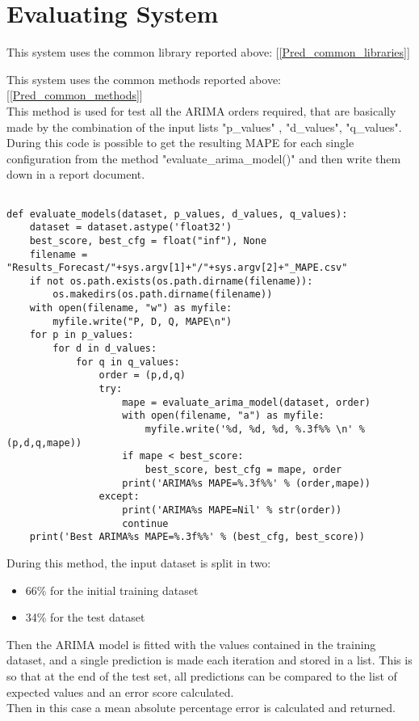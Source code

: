 \newpage

\section{Evaluating System}
\label{Evaluating_System}
This system uses the common library reported above: [\ref{Pred_common_libraries}]

This system uses the common methods reported above: [\ref{Pred_common_methods}] \\


This method is used for test all the ARIMA orders required, that are basically made by the combination of the input lists "p\_values" , "d\_values", "q\_values". During this code is possible to get the resulting MAPE for each single configuration from the method "evaluate\_arima\_model()" and then write them down in a report document.
\begin{lstlisting}

def evaluate_models(dataset, p_values, d_values, q_values):
	dataset = dataset.astype('float32')
	best_score, best_cfg = float("inf"), None
	filename = "Results_Forecast/"+sys.argv[1]+"/"+sys.argv[2]+"_MAPE.csv"
	if not os.path.exists(os.path.dirname(filename)):	
		os.makedirs(os.path.dirname(filename))
	with open(filename, "w") as myfile:
		myfile.write("P, D, Q, MAPE\n")
	for p in p_values:
		for d in d_values:
			for q in q_values:
				order = (p,d,q)
				try:
					mape = evaluate_arima_model(dataset, order)
					with open(filename, "a") as myfile:
						myfile.write('%d, %d, %d, %.3f%% \n' % (p,d,q,mape))
					if mape < best_score:
						best_score, best_cfg = mape, order
					print('ARIMA%s MAPE=%.3f%%' % (order,mape))
				except:
					print('ARIMA%s MAPE=Nil' % str(order))
					continue
	print('Best ARIMA%s MAPE=%.3f%%' % (best_cfg, best_score))
\end{lstlisting}

\newpage

During this method, the input dataset is split in two: 
\vspace{-2mm}
\begin{itemize}
 \setlength{\itemsep}{-5pt}
\item 66\% for the initial training dataset
\item 34\% for the test dataset
\end{itemize}

Then the ARIMA model is fitted with the values contained in the training dataset, and a single prediction is made each iteration and stored in a list. This is so that at the end of the test set, all predictions can be compared to the list of expected values and an error score calculated.  \cite{previousWork2}\\
Then in this case a mean absolute percentage error is calculated and returned.

